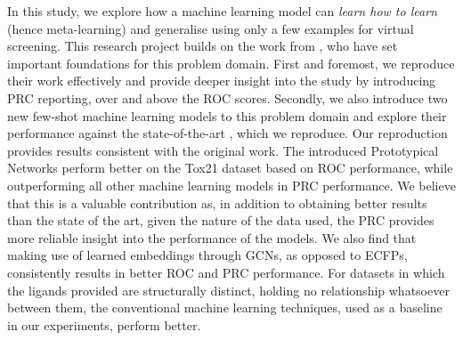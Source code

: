 \documentclass[journal=acscii,manuscript=article]{achemso}
\begin{document}
In this study, we explore how a machine learning model can \textit{learn how to learn} (hence meta-learning) and generalise using only a few examples for virtual screening. This research project builds on the work from \citet{altae2017low}, who have set important foundations for this problem domain. First and foremost, we reproduce their work effectively and provide deeper insight into the study by introducing PRC reporting, over and above the ROC scores. Secondly, we also introduce two new few-shot machine learning models to this problem domain and explore their performance against the state-of-the-art \cite{altae2017low}, which we reproduce. Our reproduction provides results consistent with the original work. The introduced Prototypical Networks perform better on the Tox21 dataset based on ROC performance, while outperforming all other machine learning models in PRC performance. We believe that this is a valuable contribution as, in addition to obtaining better results than the state of the art, given the nature of the data used, the PRC provides more reliable insight into the performance of the models. We also find that making use of learned embeddings through GCNs, as opposed to ECFPs, consistently results in better ROC and PRC performance. For datasets in which the ligands provided are structurally distinct, holding no relationship whatsoever between them, the conventional machine learning techniques, used as a baseline in our experiments, perform better.








\end{document}
